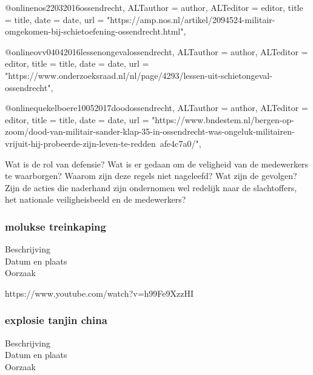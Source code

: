 {{{{{{@online{nos22032016ossendrecht,	ALTauthor = {author},	ALTeditor = {editor},	title = {title},	date = {date},	url = {"https://amp.nos.nl/artikel/2094524-militair-omgekomen-bij-schietoefening-ossendrecht.html"},}

@online{ovv04042016lessenongevalossendrecht,	ALTauthor = {author},	ALTeditor = {editor},	title = {title},	date = {date},	url = {"https://www.onderzoeksraad.nl/nl/page/4293/lessen-uit-schietongeval-ossendrecht"},}

@online{quekelboere10052017doodossendrecht,	ALTauthor = {author},	ALTeditor = {editor},	title = {title},	date = {date},	url = {"https://www.bndestem.nl/bergen-op-zoom/dood-van-militair-sander-klap-35-in-ossendrecht-was-ongeluk-militairen-vrijuit-hij-probeerde-zijn-leven-te-redden~afe4c7a0/"},}


Wat is de rol van defensie?
Wat is er gedaan om de veligheid van de medewerkers te waarborgen?
Waarom zijn deze regels niet nageleefd?
Wat zijn de gevolgen?
Zijn de acties die naderhand zijn ondernomen wel redelijk naar de slachtoffers, het nationale veiligheisbeeld en de medewerkers?



\subsubsection{molukse treinkaping }

\begin{description}
\item[Beschrijving]
\item[Datum en plaats] 
\item[Oorzaak]
\end{description}
https://www.youtube.com/watch?v=h99Fe9XzzHI 
\cite{molukseTreinkaping}
\subsubsection{explosie tanjin china }

\begin{description}
\item[Beschrijving]
\item[Datum en plaats] 
\item[Oorzaak]
\end{description}

}}}}}}
